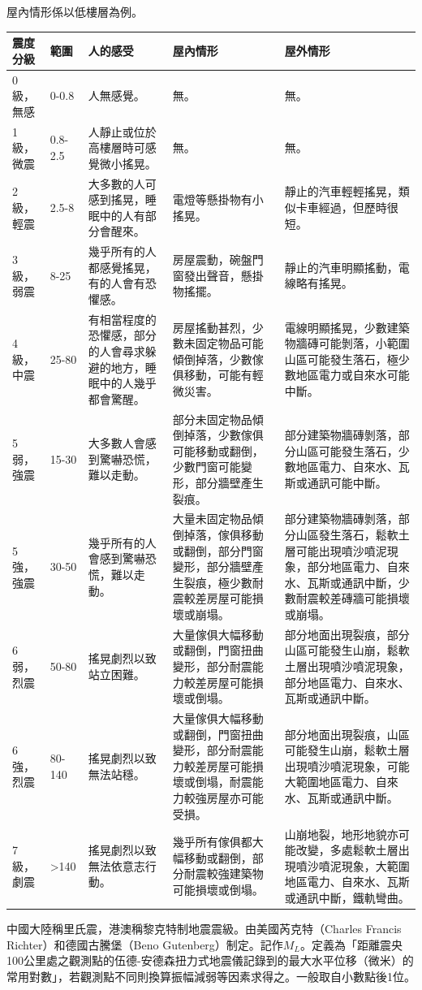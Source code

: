 \documentclass[a4paper,12pt]{report}
\begin{document}
屋內情形係以低樓層為例。
\begin{longtable}[c]{|p{}|p{}|p{}|p{}|p{}|}
\hline
\textbf{震度分級} & \textbf{範圍} & \textbf{人的感受} & \textbf{屋內情形} & \textbf{屋外情形} \\
\hline
0級，無感 & 0-0.8 & 人無感覺。 & 無。 & 無。 \\
\hline
1級，微震 & 0.8-2.5 & 人靜止或位於高樓層時可感覺微小搖晃。 & 無。 & 無。 \\
\hline
2級，輕震 & 2.5-8 & 大多數的人可感到搖晃，睡眠中的人有部分會醒來。 & 電燈等懸掛物有小搖晃。 & 靜止的汽車輕輕搖晃，類似卡車經過，但歷時很短。 \\
\hline
3級，弱震 & 8-25 & 幾乎所有的人都感覺搖晃，有的人會有恐懼感。 & 房屋震動，碗盤門窗發出聲音，懸掛物搖擺。 & 靜止的汽車明顯搖動，電線略有搖晃。 \\
\hline
4級，中震 & 25-80 & 有相當程度的恐懼感，部分的人會尋求躲避的地方，睡眠中的人幾乎都會驚醒。 & 房屋搖動甚烈，少數未固定物品可能傾倒掉落，少數傢俱移動，可能有輕微災害。 & 電線明顯搖晃，少數建築物牆磚可能剝落，小範圍山區可能發生落石，極少數地區電力或自來水可能中斷。 \\
\hline
5弱，強震 & 15-30 & 大多數人會感到驚嚇恐慌，難以走動。 & 部分未固定物品傾倒掉落，少數傢俱可能移動或翻倒，少數門窗可能變形，部分牆壁產生裂痕。 & 部分建築物牆磚剝落，部分山區可能發生落石，少數地區電力、自來水、瓦斯或通訊可能中斷。 \\
\hline
5強，強震 & 30-50 & 幾乎所有的人會感到驚嚇恐慌，難以走動。 & 大量未固定物品傾倒掉落，傢俱移動或翻倒，部分門窗變形，部分牆壁產生裂痕，極少數耐震較差房屋可能損壞或崩塌。 & 部分建築物牆磚剝落，部分山區發生落石，鬆軟土層可能出現噴沙噴泥現象，部分地區電力、自來水、瓦斯或通訊中斷，少數耐震較差磚牆可能損壞或崩塌。 \\
\hline
6弱，烈震 & 50-80 & 搖晃劇烈以致站立困難。 & 大量傢俱大幅移動或翻倒，門窗扭曲變形，部分耐震能力較差房屋可能損壞或倒塌。 & 部分地面出現裂痕，部分山區可能發生山崩，鬆軟土層出現噴沙噴泥現象，部分地區電力、自來水、瓦斯或通訊中斷。 \\
\hline
6強，烈震 & 80-140 & 搖晃劇烈以致無法站穩。 & 大量傢俱大幅移動或翻倒，門窗扭曲變形，部分耐震能力較差房屋可能損壞或倒塌，耐震能力較強房屋亦可能受損。 & 部分地面出現裂痕，山區可能發生山崩，鬆軟土層出現噴沙噴泥現象，可能大範圍地區電力、自來水、瓦斯或通訊中斷。 \\
\hline
7級，劇震 & >140 & 搖晃劇烈以致無法依意志行動。 & 幾乎所有傢俱都大幅移動或翻倒，部分耐震較強建築物可能損壞或倒塌。 & 山崩地裂，地形地貌亦可能改變，多處鬆軟土層出現噴沙噴泥現象，大範圍地區電力、自來水、瓦斯或通訊中斷，鐵軌彎曲。 \\
\hline
\end{longtable}
中國大陸稱里氏震，港澳稱黎克特制地震震級。由美國芮克特（Charles Francis Richter）和德國古騰堡（Beno Gutenberg）制定。記作$M_L$。定義為「距離震央100公里處之觀測點的伍德-安德森扭力式地震儀記錄到的最大水平位移（微米）的常用對數」，若觀測點不同則換算振幅減弱等因素求得之。一般取自小數點後1位。
\end{document}
